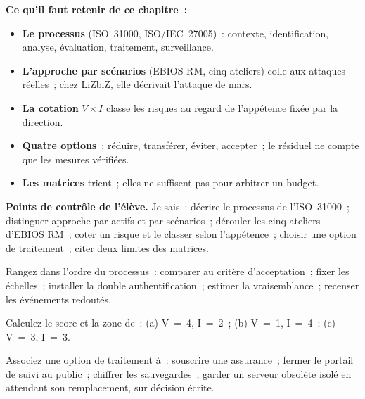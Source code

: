 \separateur

\begin{boxresume}
\textbf{Ce qu'il faut retenir de ce chapitre~:}
\begin{itemize}
    \item \textbf{Le processus} (ISO~31000, ISO/IEC~27005)~: contexte,
          identification, analyse, évaluation, traitement, surveillance.
    \item \textbf{L'approche par scénarios} (EBIOS RM, cinq ateliers) colle
          aux attaques réelles~; chez LiZbiZ, elle décrivait l'attaque de
          mars.
    \item \textbf{La cotation} \(V \times I\) classe les risques au regard
          de l'appétence fixée par la direction.
    \item \textbf{Quatre options}~: réduire, transférer, éviter, accepter~;
          le résiduel ne compte que les mesures vérifiées.
    \item \textbf{Les matrices} trient~; elles ne suffisent pas pour
          arbitrer un budget.
\end{itemize}
\end{boxresume}

\begin{boxinfo}
\textbf{Points de contrôle de l'élève.} Je sais~: décrire le processus de
l'ISO~31000~; distinguer approche par actifs et par scénarios~; dérouler
les cinq ateliers d'EBIOS RM~; coter un risque et le classer selon
l'appétence~; choisir une option de traitement~; citer deux limites des
matrices.
\end{boxinfo}

\bigskip

\begin{boxexo}[title={\ding{45}\quad Exercice~7.1. Le processus \niveaubase}]
Rangez dans l'ordre du processus~: comparer au critère d'acceptation~;
fixer les échelles~; installer la double authentification~; estimer la
vraisemblance~; recenser les événements redoutés.
\end{boxexo}

\begin{boxexo}[title={\ding{45}\quad Exercice~7.2. Coter \niveaubase}]
Calculez le score et la zone de~: (a) V~=~4, I~=~2~; (b) V~=~1, I~=~4~;
(c) V~=~3, I~=~3.
\end{boxexo}

\begin{boxexo}[title={\ding{45}\quad Exercice~7.3. Quelle option~? \niveaubase}]
Associez une option de traitement à~: souscrire une assurance~; fermer le
portail de suivi au public~; chiffrer les sauvegardes~; garder un
serveur obsolète isolé en attendant son remplacement, sur décision écrite.
\end{boxexo}

